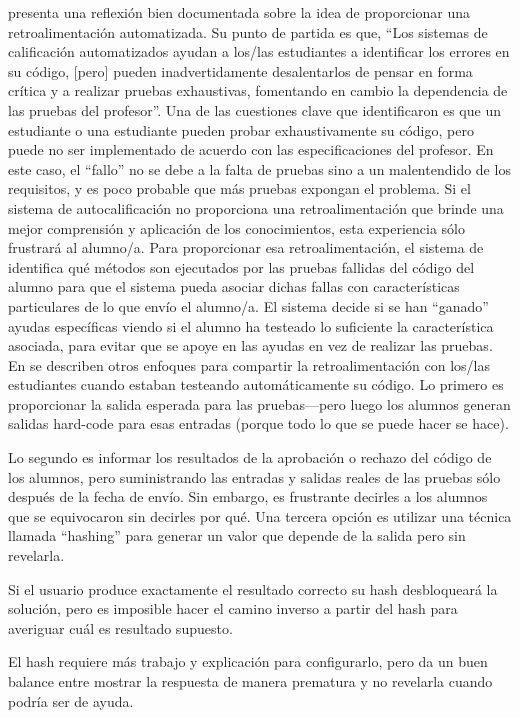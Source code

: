 \cite{Buff2015} presenta una reflexión bien documentada sobre la idea de proporcionar una retroalimentación automatizada.
Su punto de partida es que, 
``Los sistemas de calificación automatizados ayudan a los/las estudiantes a identificar los errores en su código, 
[pero] pueden inadvertidamente desalentarlos de pensar en forma crítica y a realizar pruebas exhaustivas, 
fomentando en cambio  la dependencia de las pruebas del profesor''.
Una de las cuestiones clave que identificaron es que un estudiante o una estudiante pueden probar exhaustivamente su código, pero puede no ser implementado de acuerdo con las especificaciones del profesor.
En este caso, 
el ``fallo'' no se debe a la falta de pruebas sino a un malentendido de los requisitos, y es poco probable que más pruebas expongan el problema.
Si el sistema de autocalificación no proporciona una retroalimentación que brinde una mejor comprensión y aplicación de los conocimientos, esta experiencia sólo frustrará al alumno/a.
Para proporcionar esa retroalimentación, 
el sistema de \cite{Buff2015} identifica qué métodos son ejecutados por las pruebas fallidas del código del alumno 
para que el sistema pueda asociar dichas fallas con características particulares de lo que envío el alumno/a.
El sistema decide si se han ``ganado'' ayudas específicas viendo si el alumno ha testeado lo suficiente la característica asociada, para evitar que se apoye en las ayudas en vez de realizar las pruebas.
En \cite{Srid2016} se describen otros enfoques para compartir la retroalimentación con los/las estudiantes 
cuando  estaban testeando automáticamente su código.
Lo primero es proporcionar la salida esperada para las pruebas---pero 
luego los alumnos generan salidas hard-code para esas entradas 
(porque todo lo que se puede hacer se hace).

Lo segundo es informar  los resultados de la aprobación o rechazo del código de los alumnos, 
pero suministrando las entradas y salidas reales de las pruebas sólo después de la fecha de envío.
Sin embargo, 
es frustrante decirles a los alumnos que se equivocaron sin decirles por qué.
Una tercera opción es utilizar una técnica llamada ``hashing'' para generar un valor que depende de la salida pero sin revelarla.

Si el usuario produce exactamente el resultado correcto
su hash desbloqueará la solución, 
pero es imposible hacer el camino inverso a partir del hash para averiguar cuál es resultado supuesto.

El hash requiere más trabajo y explicación para configurarlo, 
pero da un buen balance entre mostrar la respuesta de manera prematura y no revelarla cuando podría ser de ayuda.

